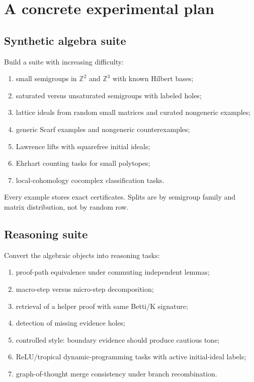\documentclass[11pt]{article}
\theoremstyle{definition}
\newcommand{\ZZ}{\mathbb{Z}}
\begin{document}
\section{A concrete experimental plan}
\subsection{Synthetic algebra suite}
Build a suite with increasing difficulty:
\begin{enumerate}[leftmargin=*]
\item small semigroups in \(\ZZ^2\) and \(\ZZ^3\) with known Hilbert bases;
\item saturated versus unsaturated semigroups with labeled holes;
\item lattice ideals from random small matrices and curated nongeneric examples;
\item generic Scarf examples and nongeneric counterexamples;
\item Lawrence lifts with squarefree initial ideals;
\item Ehrhart counting tasks for small polytopes;
\item local-cohomology cocomplex classification tasks.
\end{enumerate}
Every example stores exact certificates.  Splits are by semigroup family and matrix distribution, not by random row.

\subsection{Reasoning suite}
Convert the algebraic objects into reasoning tasks:
\begin{enumerate}[leftmargin=*]
\item proof-path equivalence under commuting independent lemmas;
\item macro-step versus micro-step decomposition;
\item retrieval of a helper proof with same Betti/K signature;
\item detection of missing evidence holes;
\item controlled style: boundary evidence should produce cautious tone;
\item ReLU/tropical dynamic-programming tasks with active initial-ideal labels;
\item graph-of-thought merge consistency under branch recombination.
\end{enumerate}
\end{document}
